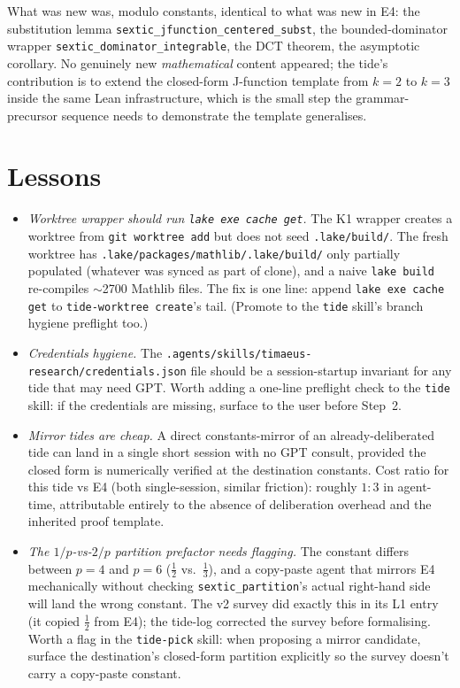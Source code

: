 \documentclass[11pt]{article}
\begin{document}
What was new was, modulo constants, identical to what was new in
E4: the substitution lemma
\texttt{sextic\_jfunction\_centered\_subst}, the bounded-dominator
wrapper \texttt{sextic\_dominator\_integrable}, the DCT theorem, the
asymptotic corollary. No genuinely new \emph{mathematical} content
appeared; the tide's contribution is to extend the closed-form
J-function template from $k=2$ to $k=3$ inside the same Lean
infrastructure, which is the small step the grammar-precursor
sequence needs to demonstrate the template generalises.

\section{Lessons}

\begin{itemize}[leftmargin=1em,itemsep=0.2em]
\item \emph{Worktree wrapper should run \texttt{lake exe cache get}.}
The K1 wrapper creates a worktree from \texttt{git worktree add}
but does not seed \texttt{.lake/build/}. The fresh worktree has
\texttt{.lake/packages/mathlib/.lake/build/} only partially
populated (whatever was synced as part of clone), and a naive
\texttt{lake build} re-compiles ${\sim}$2700 Mathlib files. The
fix is one line: append \texttt{lake exe cache get} to
\texttt{tide-worktree create}'s tail. (Promote to the
\texttt{tide} skill's branch hygiene preflight too.)

\item \emph{Credentials hygiene.} The
\texttt{.agents/skills/timaeus-research/credentials.json} file
should be a session-startup invariant for any tide that may
need GPT. Worth adding a one-line preflight check to the
\texttt{tide} skill: if the credentials are missing, surface to
the user before Step~2.

\item \emph{Mirror tides are cheap.} A direct constants-mirror of an
already-deliberated tide can land in a single short session with no
GPT consult, provided the closed form is numerically verified at
the destination constants. Cost ratio for this tide vs E4
(both single-session, similar friction): roughly $1{:}3$ in
agent-time, attributable entirely to the absence of
deliberation overhead and the inherited proof template.

\item \emph{The $1/p$-vs-$2/p$ partition prefactor needs flagging.}
The constant differs between $p=4$ and $p=6$ ($\tfrac12$
vs.~$\tfrac13$), and a copy-paste agent that mirrors E4
mechanically without checking \texttt{sextic\_partition}'s actual
right-hand side will land the wrong constant. The v2 survey did
exactly this in its L1 entry (it copied $\tfrac12$ from E4); the
tide-log corrected the survey before formalising. Worth a flag
in the \texttt{tide-pick} skill: when proposing a mirror
candidate, surface the destination's closed-form partition
explicitly so the survey doesn't carry a copy-paste constant.
\end{itemize}
\end{document}

